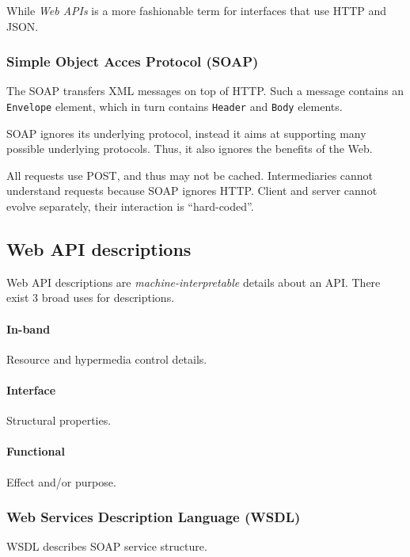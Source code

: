 \documentclass{report}
\begin{document}
While \textit{Web APIs} is a more fashionable term
for interfaces that use HTTP and JSON.

\subsubsection{Simple Object Acces Protocol (SOAP)}

The SOAP transfers XML messages on top of HTTP.
Such a message contains an \texttt{Envelope} element,
which in turn contains \texttt{Header} and \texttt{Body} elements.

SOAP ignores its underlying protocol,
instead it aims at supporting many possible underlying protocols.
Thus, it also ignores the benefits of the Web.

All requests use POST, and thus may not be cached.
Intermediaries cannot understand requests because SOAP ignores HTTP.
Client and server cannot evolve separately,
their interaction is ``hard-coded''.

\subsection{Web API descriptions}

Web API descriptions are \emph{machine-interpretable} details about an API.
There exist 3 broad uses for descriptions.

\paragraph{In-band}

Resource and hypermedia control details.

\paragraph{Interface}

Structural properties.

\paragraph{Functional}

Effect and/or purpose.

\subsubsection{Web Services Description Language (WSDL)}

WSDL describes SOAP service structure.
\end{document}
